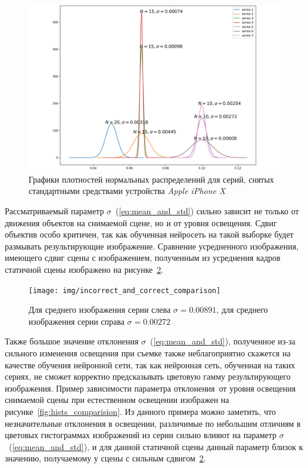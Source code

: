 \documentclass[14pt]{mmcs_article}
\begin{document}
\begin{figure}[H]
	\centering
	\includegraphics[scale=0.08]{img/series_apple_denoising_deviation_comparison}
	\caption{Графики плотностей нормальных распределений для серий, снятых стандартными средствами устройства \textit{Apple iPhone X}}
	\label{fig:distribuion_after_apple_denoising}
\end{figure}


Рассматриваемый параметр $\sigma$~(\ref{eq:mean_and_std}) сильно зависит не только от движения объектов на снимаемой сцене, но и от уровня освещения. Сдвиг объектив особо критичен, так как обученная нейросеть на такой выборке будет размывать результирующие изображение. Сравнение усредненного изображения, имеющего сдвиг сцены с изображением, полученным из усреднения кадров статичной сцены изображено на рисунке~\ref{fig:deviations_comparision}. 

\begin{figure}[H]
	\centering
	\texttt{[image: img/incorrect\_and\_correct\_comparison]}
	\caption{Для среднего изображения серии слева $\sigma = 0.00891$, для среднего изображения серии справа $\sigma = 0.00272$}
	\label{fig:deviations_comparision}
\end{figure}

Также большое значение отклонения $\sigma$~(\ref{eq:mean_and_std}), полученное из-за сильного изменения освещения при съемке также неблагоприятно скажется на качестве обучения нейронной сети, так как нейронная сеть, обученная на таких сериях, не сможет корректно предсказывать цветовую гамму результирующего изображения. Пример зависимости параметра отклонения от уровня освещения снимаемой сцены при естественном освещении изображен на рисунке~\ref{fig:hists_comparision}. Из данного примера  можно заметить, что незначительные отклонения в освещении, различимые по небольшим отличиям в цветовых гистограммах изображений из серии сильно влияют на параметр $\sigma$~(\ref{eq:mean_and_std}), и для данной статичной сцены данный параметр близок к значению, получаемому у сцены с сильным сдвигом~\ref{fig:deviations_comparision}.
\end{document}
